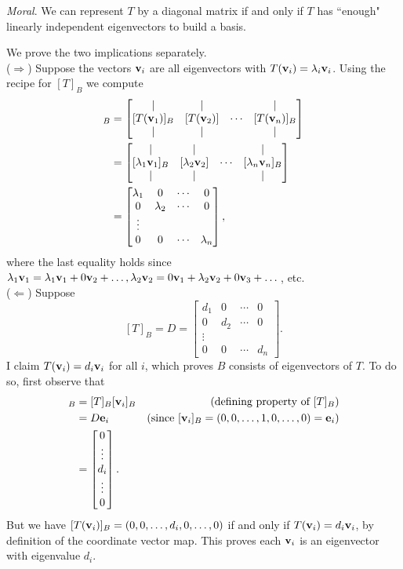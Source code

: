 \noindent
{\em Moral}. We can represent $T$ by a diagonal matrix if and only if $T$ has ``enough" linearly independent eigenvectors to build a basis. 
\\
\begin{solution}
\noindent
We prove the two implications separately. 
\vspace{.1in}
\\
($\Rightarrow$) Suppose the vectors ${\mathbf v}_i$ are all eigenvectors with $T({\mathbf v}_i)=\lambda_i{\mathbf v}_i$. Using the recipe for $[T]_{B}$ we compute 
\begin{align*}
[T]_B&=\begin{bmatrix}
\vert &\vert & &\vert\\
[T(\boldv_1)]_B&[T(\boldv_2)]&\cdots &[T(\boldv_n)]_B\\
\vert &\vert & &\vert
\end{bmatrix}\\
&=\begin{bmatrix}
\vert &\vert & &\vert\\
[\lambda_1\boldv_1]_B&[\lambda_2\boldv_2]&\cdots& [\lambda_n\boldv_n]_B\\
\vert &\vert & &\vert
\end{bmatrix}\\
&=\begin{bmatrix}\lambda_1&0&\cdots &0\\
0&\lambda_2&\cdots&0\\
\vdots & & &\\
0&0&\cdots&\lambda_n
\end{bmatrix},
\end{align*}
where the last equality holds since $\lambda_1{\mathbf v}_1=\lambda_1{\mathbf v}_1+0{\mathbf v}_2+\dots, \lambda_2{\mathbf v}_2=0{\mathbf v}_1+\lambda_2{\mathbf v}_2+0{\mathbf v}_3+\dots$, etc. 
\vspace{.1in}
\\
($\Leftarrow$) Suppose 
\[
[T]_B=D=\begin{bmatrix}d_1&0&\cdots &0\\
0&d_2&\cdots&0\\
\vdots & & &\\
0&0&\cdots&d_n
\end{bmatrix}.
\]
I claim $T({\mathbf v}_i)=d_i{\mathbf v}_i$ for all $i$, which proves $B$ consists of eigenvectors of $T$. To do so, first observe that 
\begin{align*}
[T(\boldv_i)]_B&=[T]_B[\boldv_i]_B &\text{(defining property of $[T]_B$)}\\
&=D\bolde_i &\text{(since $[\boldv_i]_B=(0,0,\dots, 1,0,\dots, 0)=\bolde_i$)}\\
&=\begin{bmatrix}
0\\ \vdots \\ d_i\\ \vdots \\ 0
\end{bmatrix}.
\end{align*}
But we have $[T({\mathbf v}_i)]_B=(0,0,\dots, d_i, 0,\dots, 0)$ if and only if $T({\mathbf v}_i)=d_i{\mathbf v}_i$, by definition of the coordinate vector map. This proves each ${\mathbf v}_i$ is an eigenvector with eigenvalue $d_i$. 
\end{solution}
\ee
